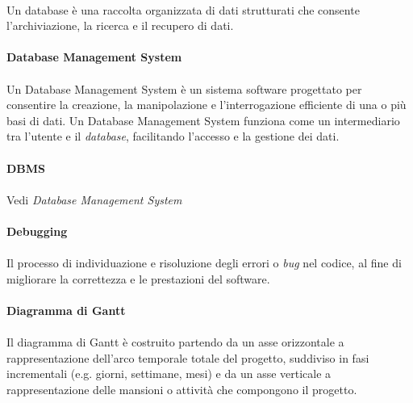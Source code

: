 \documentclass[10pt, a4paper]{article}
\begin{document}
\paragraph{}Un database è una raccolta organizzata di dati strutturati che consente l'archiviazione, la ricerca e il recupero di dati.

\vspace{2em}
\paragraph{Database Management System}\noindent\hrulefill
\paragraph{}Un Database Management System è un sistema software progettato per consentire la creazione, la manipolazione e l’interrogazione efficiente di una o più basi di dati. Un Database Management System funziona come un intermediario tra l’utente e il \textit{database\pg}, facilitando l’accesso e la gestione dei dati.

\vspace{2em}
\paragraph{DBMS}\noindent\hrulefill
\paragraph{}Vedi \textit{Database Management System\pg}


\vspace{2em}
\paragraph{Debugging}\noindent\hrulefill
\paragraph{}Il processo di individuazione e risoluzione degli errori o \textit{bug\pg} nel codice, al fine di migliorare la correttezza e le prestazioni del software.


\vspace{2em}
\paragraph{Diagramma di Gantt}\noindent\hrulefill
\paragraph{}Il diagramma di Gantt è costruito partendo da un asse orizzontale a rappresentazione dell’arco temporale
totale del progetto, suddiviso in fasi incrementali (e.g. giorni, settimane, mesi) e da un asse
verticale a rappresentazione delle mansioni o attività che compongono il progetto.
\end{document}
